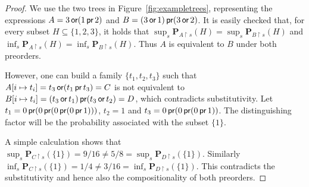 \begin{proof}
    We use the two trees in Figure~\ref{fig:exampletrees},
    representing the expressions $A = 3 \operatorname{\textsf{or}} (1 \operatorname{\textsf{pr}} 2)$
    and $B = (3 \operatorname{\textsf{or}} 1) \operatorname{\textsf{pr}} (3 \operatorname{\textsf{or}} 2)$. It is easily checked that, for every subset $H \subseteq \{ 1, 2, 3 \}$,
    it holds that $\sup_s  \mathbf{P}_{A\restriction s} (H) =  \sup_s \mathbf{P}_{B\restriction s} (H)$ and
    $\inf_s  \mathbf{P}_{A\restriction s} (H) =  \inf_s \mathbf{P}_{B\restriction s} (H)$.
     Thus $A$ is equivalent 
    to $B$ under  both preorders.

    However, one can build a family $\{ t_1, t_2, t_3\}$ such that 
    $A[ i \mapsto t_i] = t_3 \operatorname{\textsf{or}} (t_1 \operatorname{\textsf{pr}} t_3) = C$ is not equivalent to 
    $B[ i\mapsto t_i] = (t_3 \operatorname{\textsf{or}} t_1) \operatorname{\textsf{pr}} (t_3 \operatorname{\textsf{or}} t_2) = D$,
    which contradicts substitutivity.
    Let $t_1 = 0 \operatorname{\textsf{pr}} (0 \operatorname{\textsf{pr}} (0 \operatorname{\textsf{pr}} (0 \operatorname{\textsf{pr}} 1)))$,
    $t_2 = 1$ and $t_3 = 0 \operatorname{\textsf{pr}} (0 \operatorname{\textsf{pr}} (0 \operatorname{\textsf{pr}} 1))$. The distinguishing 
    factor will be the probability associated with the subset $\{ 1 \}$.

    A simple calculation shows that $\sup_s  \mathbf{P}_{C\restriction s} (\{1\}) = 9/16
    \neq 5/8 = \sup_s \mathbf{P}_{D\restriction s} (\{ 1\})$. Similarly
    $\inf_s  \mathbf{P}_{C\restriction s} (\{1\}) = 1/4 \neq 3/16 =
     \inf_s \mathbf{P}_{D \restriction s } (\{1\})$.
     This contradicts the substitutivity and hence also the compositionality of both preorders.
\end{proof}



